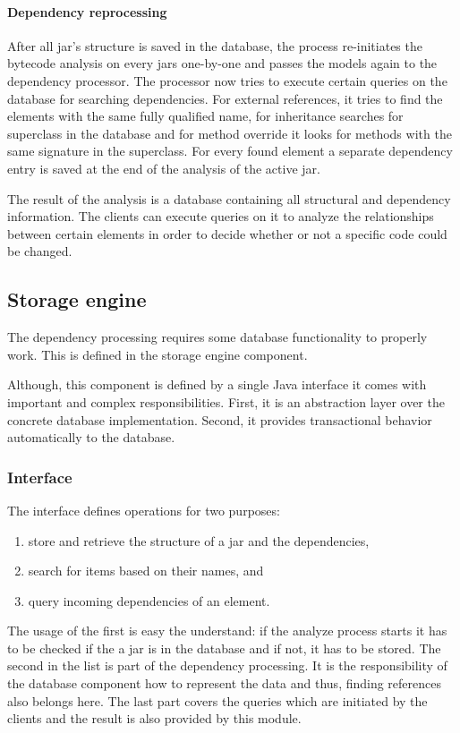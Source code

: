 \paragraph{Dependency reprocessing} 
After all jar's  structure is saved in the database, the process re-initiates
the bytecode analysis on every jars one-by-one and passes the models again to
the dependency processor. The processor now tries to execute certain queries on
the database for searching dependencies. For external references, it tries to
find the elements with the same fully qualified name, for inheritance searches for
superclass in the database and for method override it looks for methods with
the same signature in the superclass. For every found element  a separate dependency
entry is saved at the end of the analysis of the active jar.

The result of the analysis is a database containing all  structural
and dependency information. The clients can execute queries on it to analyze the
relationships between certain elements in order to decide whether or not a
specific code could be changed.
 
 
\subsection{Storage engine} 
The dependency processing requires some database functionality to 
properly work. This is defined in the storage engine component.

Although, this component is defined by a single Java interface it comes with
important and complex responsibilities. First, it is an abstraction layer over
the concrete database implementation. Second, it provides transactional behavior
automatically to the database. 

\subsubsection{Interface}
The interface defines operations for two purposes: 
\begin{enumerate}
  \item store and retrieve the structure of a jar and the dependencies,
  \item search for items based on their names, and
  \item query incoming dependencies of an element.
\end{enumerate}

The usage of the first is easy the understand: if the analyze process starts it
has to be checked if the a jar is in the database and if not, it has to be
stored. The second in the list is part of the dependency processing. It is the
responsibility of the database component how to represent the data and thus,
finding references also belongs here. The last part covers the queries which are
initiated by the clients and the result is also provided by this module.


